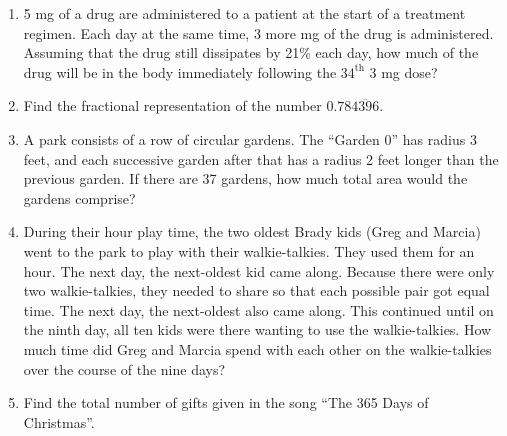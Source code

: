 \begin{problems}
\begin{enumerate}
\item 5 mg of a drug are administered to a patient at the start of a treatment regimen.  Each day at the same time, 3 more mg of the drug is administered.  Assuming that the drug still dissipates by 21\% each day, how much of the drug will be in the body immediately following the 3$4^\mathrm{th}$ 3 mg dose?

\item Find the fractional representation of the number $0.78\overline{4396}$.

\item A park consists of a row of circular gardens.  The ``Garden 0'' has radius 3 feet, and each successive garden after that has a radius 2 feet longer than the previous garden.  If there are 37 gardens, how much total area would the gardens comprise?

\item During their hour play time, the two oldest Brady kids (Greg and Marcia) went to the park to play with their walkie-talkies.  They used them for an hour.  The next day, the next-oldest kid came along.  Because there were only two walkie-talkies, they needed to share so that each possible pair got equal time.  The next day, the next-oldest also came along.  This continued until on the ninth day, all ten kids were there wanting to use the walkie-talkies.  How much time did Greg and Marcia spend with each other on the walkie-talkies over the course of the nine days?

\item Find the total number of gifts given in the song ``The 365 Days of Christmas''.

\end{enumerate}
\end{problems}

